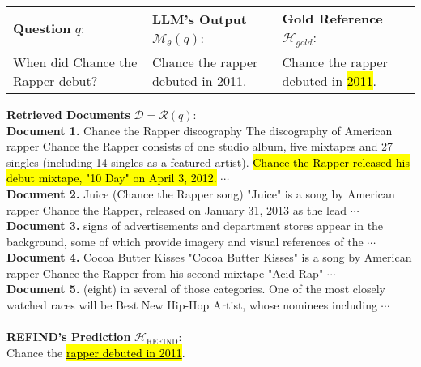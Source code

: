 \begin{figure*}[ht!]
\scriptsize
\begin{tcolorbox}[boxrule=0pt]
    \begin{tabularx}{\textwidth}{X|X|X}
        \textbf{Question} $q$: & \textbf{LLM's Output} $\mathcal{M}_\theta(q)$: & \textbf{Gold Reference} $\mathcal{H}_{gold}$: \\
        When did Chance the Rapper debut? & Chance the rapper debuted in 2011. & Chance the rapper debuted in \underline{\hl{2011}}.
    \end{tabularx}
\end{tcolorbox}

\vspace{-2.5mm}


\begin{tcolorbox}[boxrule=0pt]

  \textbf{Retrieved Documents} $\mathcal{D}=\mathcal{R}(q)$: \\
  \textbf{Document 1.} Chance the Rapper discography The discography of American rapper Chance the Rapper consists of one studio album, five mixtapes and 27 singles (including 14 singles as a featured artist). \hl{Chance the Rapper released his debut mixtape, "10 Day" on April 3, 2012.} $\cdots$\\
  \textbf{Document 2.} Juice (Chance the Rapper song) "Juice" is a song by American rapper Chance the Rapper, released on January 31, 2013 as the lead $\cdots$\\
  \textbf{Document 3.} signs of advertisements and department stores appear in the background, some of which provide imagery and visual references of the $\cdots$\\
  \textbf{Document 4.} Cocoa Butter Kisses "Cocoa Butter Kisses" is a song by American rapper Chance the Rapper from his second mixtape "Acid Rap" $\cdots$\\
  \textbf{Document 5.} (eight) in several of those categories. One of the most closely watched races will be Best New Hip-Hop Artist, whose nominees including $\cdots$
  \\\\
  \textbf{REFIND's Prediction} $\mathcal{H}_{\mathrm{REFIND}}$: \\
  Chance the \underline{\hl{rapper debuted in 2011}}.
\end{tcolorbox}


\end{figure*}
